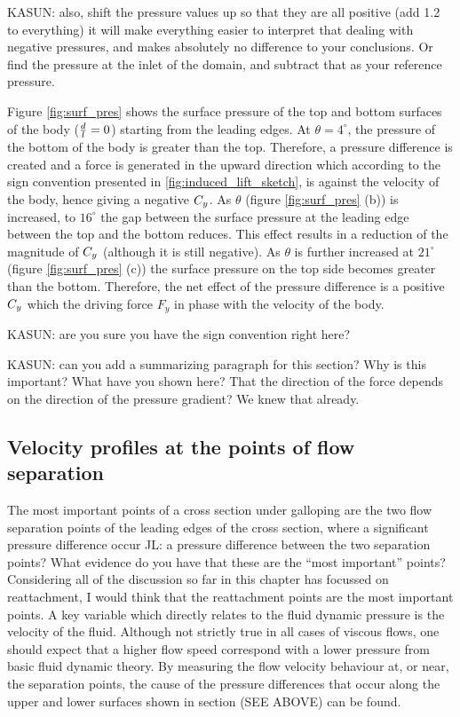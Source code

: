 KASUN: also, shift the pressure values up so that they are all positive (add 1.2 to everything) it will make everything easier to interpret that dealing with negative pressures, and makes absolutely no difference to your conclusions. Or find the pressure at the inlet of the domain, and subtract that as your reference pressure.
 
Figure \ref{fig:surf_pres} shows the surface pressure of the top and bottom surfaces of the body ($\frac{d}{l}=0$) starting from  the leading edges. At $\theta=4^{\circ}$, the pressure of the bottom of the body is greater than the top. Therefore, a pressure difference is created and a force is generated in the upward direction which according to the sign convention presented in \ref{fig:induced_lift_sketch}, is against the velocity of the body, hence giving a negative $C_{y}$. As $\theta$ (figure \ref{fig:surf_pres} (b)) is increased, to $16^{\circ}$ the gap between the surface pressure at the leading edge between the top and the bottom reduces. This effect results in a reduction of the magnitude of $C_{y}$ (although it is still negative). As $\theta$ is further increased at $21^{\circ}$ (figure \ref{fig:surf_pres} (c)) the surface pressure on the top side becomes greater than the bottom. Therefore, the net effect of the pressure difference is a positive $C_{y}$ which the driving force $F_y$ in phase with the velocity of the body.

KASUN: are you sure you have the sign convention right here?

KASUN: can you add a summarizing paragraph for this section? Why is this important? What have you shown here? That the direction of the force depends on the direction of the pressure gradient? We knew that already.

\subsection{Velocity profiles at the points of flow separation}

The most important points of a cross section under galloping are the two flow separation points of the leading edges of the cross section, where a significant pressure difference occur JL: a pressure difference between the two separation points? What evidence do you have that these are the ``most important'' points? Considering all of the discussion so far in this chapter has focussed on reattachment, I would think that the reattachment points are the most important points. A key variable which directly relates to the fluid dynamic pressure is the velocity of the fluid. Although not strictly true in all cases of viscous flows, one should expect that a higher flow speed correspond with a lower pressure from basic fluid dynamic theory. By measuring the flow velocity behaviour at, or near, the separation points, the cause of the pressure differences that occur along the upper and lower surfaces shown in section (SEE ABOVE) can be found.

